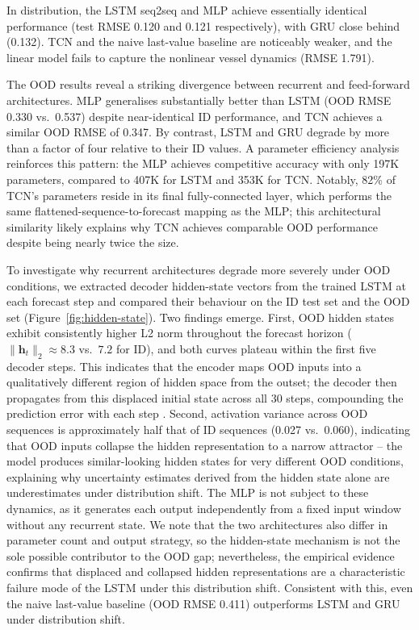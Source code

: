 \documentclass[a4paper,fleqn]{cas-sc}
\begin{document}
In distribution, the LSTM seq2seq and MLP achieve essentially identical performance (test RMSE 0.120 and 0.121 respectively), with GRU close behind (0.132). TCN and the naive last-value baseline are noticeably weaker, and the linear model fails to capture the nonlinear vessel dynamics (RMSE 1.791).

The OOD results reveal a striking divergence between recurrent and feed-forward architectures. MLP generalises substantially better than LSTM (OOD RMSE 0.330 vs.\ 0.537) despite near-identical ID performance, and TCN achieves a similar OOD RMSE of 0.347. By contrast, LSTM and GRU degrade by more than a factor of four relative to their ID values. A parameter efficiency analysis reinforces this pattern: the MLP achieves competitive accuracy with only 197K parameters, compared to 407K for LSTM and 353K for TCN. Notably, 82\% of TCN's parameters reside in its final fully-connected layer, which performs the same flattened-sequence-to-forecast mapping as the MLP; this architectural similarity likely explains why TCN achieves comparable OOD performance despite being nearly twice the size.

To investigate why recurrent architectures degrade more severely under OOD conditions, we extracted decoder hidden-state vectors from the trained LSTM at each forecast step and compared their behaviour on the ID test set and the OOD set (Figure~\ref{fig:hidden-state}). Two findings emerge. First, OOD hidden states exhibit consistently higher L2 norm throughout the forecast horizon ($\|\mathbf{h}_t\|_2 \approx 8.3$ vs.\ $7.2$ for ID), and both curves plateau within the first five decoder steps. This indicates that the encoder maps OOD inputs into a qualitatively different region of hidden space from the outset; the decoder then propagates from this displaced initial state across all 30 steps, compounding the prediction error with each step \cite{quinonero2008dataset}. Second, activation variance across OOD sequences is approximately half that of ID sequences (0.027 vs.\ 0.060), indicating that OOD inputs collapse the hidden representation to a narrow attractor -- the model produces similar-looking hidden states for very different OOD conditions, explaining why uncertainty estimates derived from the hidden state alone are underestimates under distribution shift. The MLP is not subject to these dynamics, as it generates each output independently from a fixed input window without any recurrent state. We note that the two architectures also differ in parameter count and output strategy, so the hidden-state mechanism is not the sole possible contributor to the OOD gap; nevertheless, the empirical evidence confirms that displaced and collapsed hidden representations are a characteristic failure mode of the LSTM under this distribution shift. Consistent with this, even the naive last-value baseline (OOD RMSE 0.411) outperforms LSTM and GRU under distribution shift.
\end{document}
